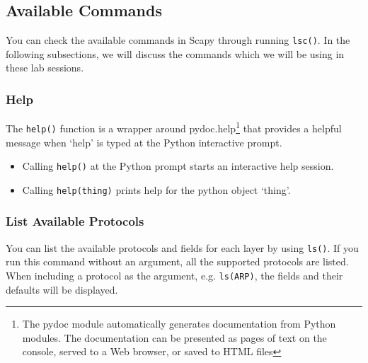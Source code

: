 \documentclass[11pt,a4paper]{article}
\begin{document}
\subsection{Available Commands}
You can check the available commands in Scapy through running \texttt{lsc()}. In the following subsections, we will discuss the commands which we will be using in these lab sessions.

\subsubsection{Help}
The \texttt{help()} function is a wrapper around pydoc.help\footnote{The pydoc module automatically generates documentation from Python modules. The documentation can be presented as pages of text on the console, served to a Web browser, or saved to HTML files} that provides a helpful message when `help' is typed at the Python interactive prompt.

\begin{itemize}
  \item Calling \texttt{help()} at the Python prompt starts an interactive help session.
  \item Calling \texttt{help(thing)} prints help for the python object `thing'.
\end{itemize}

\subsubsection{List Available Protocols}
You can list the available protocols and fields for each layer by using \texttt{ls()}. 
If you run this command without an argument, all the supported protocols are listed.
When including a protocol as the argument, e.g. \texttt{ls(ARP)}, the fields and their defaults will be displayed.

\end{document}
